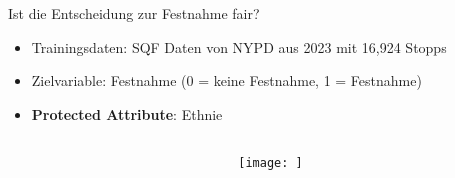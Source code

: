 \documentclass[aspectratio=169]{beamer}
\begin{document}
\begin{frame}{Ist die Entscheidung zur Festnahme fair?}
    \begin{itemize}
        \item Trainingsdaten: SQF Daten von NYPD aus 2023 mit 16,924 Stopps
        \item Zielvariable: Festnahme \cite{Badr2022DTFANSP} (0 = keine Festnahme, 1 = Festnahme) 
        \item \textbf{Protected Attribute}: Ethnie
    \end{itemize}

    \vspace{0.5cm} %

    \begin{columns}[c] %
        \begin{column}{0.5\textwidth}
            \centering
        \end{column}

        \begin{column}{0.5\textwidth}
            \centering
            \texttt{[image: ]}
        \end{column}
    \end{columns}
\end{frame}
\end{document}

